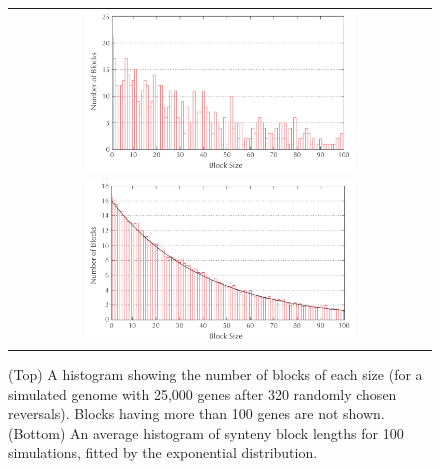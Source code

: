 \begin{figure}[h]
\centering
\begin{tabular}{c}
\includegraphics[width = 0.65\textwidth]{images/rearrangements/histogram_exponential_distribution_one_run}\\[2ex]
\includegraphics[width = 0.65\textwidth]{images/rearrangements/histogram_exponential_distribution_many_runs}
\end{tabular}
\caption{(Top) A histogram showing the number of blocks of each size (for a simulated genome with 25,000 genes after 320 randomly chosen reversals). Blocks having more than 100 genes are not shown. (Bottom) An average histogram of synteny block lengths for 100 simulations, fitted by the exponential distribution.}
\label{fig:histogram_exponential_distribution}
\end{figure}

